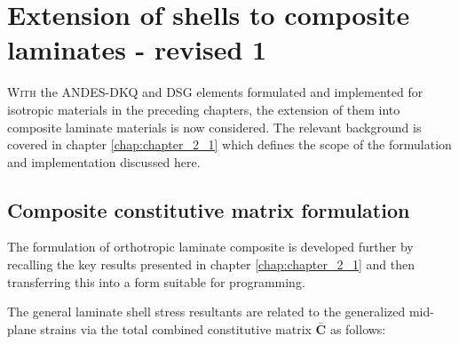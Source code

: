 



\chapter{Extension of shells to composite laminates - revised 1}
\label{chap:chapter_composite_formulation_implementation}

\renewcommand{\Thema}{Extension of shells to composite laminates}

\lettrine[lines=2]{W}{ith} the ANDES-DKQ and DSG elements formulated and implemented for isotropic materials in the preceding chapters, the extension of them into composite laminate materials is now considered. The relevant background is covered in chapter \ref{chap:chapter_2_1} which defines the scope of the formulation and implementation discussed here.

\section{Composite constitutive matrix formulation}
The formulation of orthotropic laminate composite is developed further by recalling the key results presented in chapter \ref{chap:chapter_2_1} and then transferring this into a form suitable for programming.

The general laminate shell stress resultants are related to the generalized mid-plane strains via the total combined constitutive matrix $\bar{\mathbf{C}}$ as follows:

